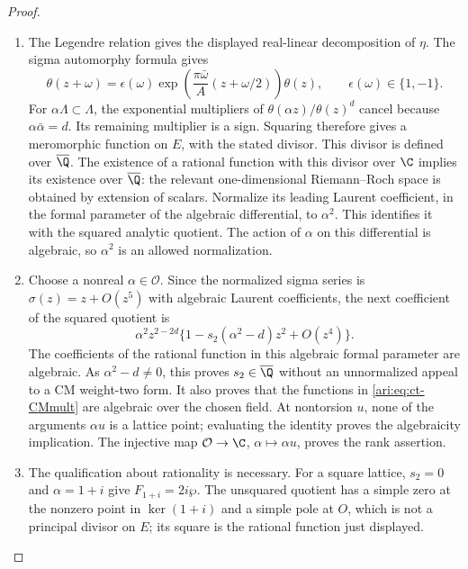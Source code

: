 \begin{proof}
\begin{enumerate}[label={$\langle1\rangle$\arabic*.},leftmargin=*]
\item The Legendre relation gives the displayed real-linear decomposition
of $\eta$. The sigma automorphy formula gives
\[
 \theta(z+\omega)=\epsilon(\omega)
  \exp\left(\frac{\pi\bar\omega}{A}
                         (z+\omega/2)\right)\theta(z),
 \qquad \epsilon(\omega)\in\{1,-1\}.
\]
For $\alpha\Lambda\subset\Lambda$, the exponential multipliers
of $\theta(\alpha z)/\theta(z)^d$ cancel because
$\alpha\bar\alpha=d$. Its remaining multiplier is a sign.
Squaring therefore gives a meromorphic function on $E$, with the
stated divisor. This divisor is defined over $\overline{\Q}$.
The existence of a rational function with this divisor over $\C$
implies its existence over $\overline{\Q}$: the relevant
one-dimensional Riemann--Roch space is obtained by extension of
scalars. Normalize its leading Laurent coefficient, in the formal
parameter of the algebraic differential, to $\alpha^2$. This
identifies it with the squared analytic quotient. The action of
$\alpha$ on this differential is algebraic, so $\alpha^2$ is an
allowed normalization.

\item Choose a nonreal $\alpha\in\mathcal O$. Since the normalized
sigma series is $\sigma(z)=z+O(z^5)$ with algebraic Laurent
coefficients, the next coefficient of the squared quotient is
\[
 \alpha^2z^{2-2d}
       \{1-s_2(\alpha^2-d)z^2+O(z^4)\}.
\]
The coefficients of the rational function in this algebraic formal
parameter are algebraic. As $\alpha^2-d\ne0$, this proves
$s_2\in\overline{\Q}$ without an unnormalized appeal to a CM
weight-two form. It also proves that the functions in
\eqref{ari:eq:ct-CMmult} are algebraic over the chosen field.
At nontorsion $u$, none of the arguments $\alpha u$ is a lattice
point; evaluating the identity proves the algebraicity implication.
The injective map $\mathcal O\to\C$, $\alpha\mapsto\alpha u$,
proves the rank assertion.

\item The qualification about rationality is necessary. For a square
lattice, $s_2=0$ and $\alpha=1+i$ give
$F_{1+i}=2i\wp$. The unsquared quotient has a simple zero at
the nonzero point in $\ker(1+i)$ and a simple pole at $O$,
which is not a principal divisor on $E$; its square is the
rational function just displayed.
\end{enumerate}
\end{proof}
